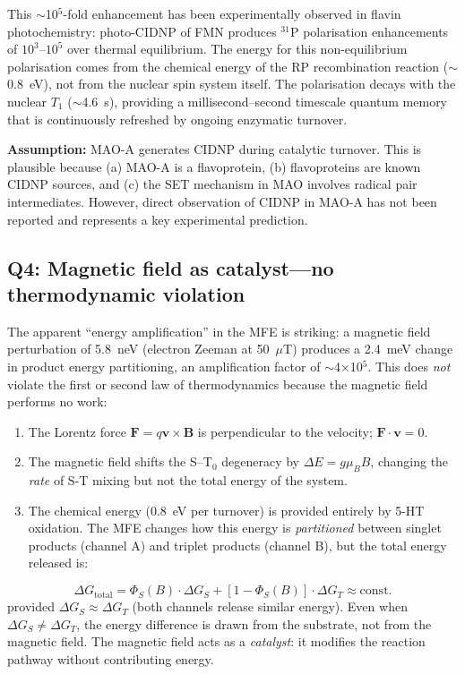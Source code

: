 This $\sim$10$^5$-fold enhancement has been experimentally observed in flavin photochemistry\cite{Tsentalovich2002}: photo-CIDNP of FMN produces $^{31}$P polarisation enhancements of $10^3$--$10^5$ over thermal equilibrium. The energy for this non-equilibrium polarisation comes from the chemical energy of the RP recombination reaction ($\sim$0.8~eV), not from the nuclear spin system itself. The polarisation decays with the nuclear $T_1$ ($\sim$4.6~s), providing a millisecond--second timescale quantum memory that is continuously refreshed by ongoing enzymatic turnover.

\textbf{Assumption:} MAO-A generates CIDNP during catalytic turnover. This is plausible because (a) MAO-A is a flavoprotein, (b) flavoproteins are known CIDNP sources\cite{Tsentalovich2002}, and (c) the SET mechanism in MAO involves radical pair intermediates\cite{Edmondson2004}. However, direct observation of CIDNP in MAO-A has not been reported and represents a key experimental prediction.

\subsection{Q4: Magnetic field as catalyst---no thermodynamic violation}

The apparent ``energy amplification'' in the MFE is striking: a magnetic field perturbation of 5.8~neV (electron Zeeman at 50~$\mu$T) produces a 2.4~meV change in product energy partitioning, an amplification factor of $\sim$4$\times$10$^5$. This does \emph{not} violate the first or second law of thermodynamics because the magnetic field performs no work:

\begin{enumerate}
\item The Lorentz force $\mathbf{F} = q\mathbf{v} \times \mathbf{B}$ is perpendicular to the velocity; $\mathbf{F} \cdot \mathbf{v} = 0$.
\item The magnetic field shifts the S--T$_0$ degeneracy by $\Delta E = g\mu_B B$, changing the \emph{rate} of S-T mixing but not the total energy of the system.
\item The chemical energy (0.8~eV per turnover) is provided entirely by 5-HT oxidation. The MFE changes how this energy is \emph{partitioned} between singlet products (channel A) and triplet products (channel B), but the total energy released is:
\end{enumerate}
\begin{equation}
\Delta G_\mathrm{total} = \Phi_S(B) \cdot \Delta G_S + [1 - \Phi_S(B)] \cdot \Delta G_T \approx \text{const.}
\label{eq:energy_conserve}
\end{equation}
provided $\Delta G_S \approx \Delta G_T$ (both channels release similar energy). Even when $\Delta G_S \neq \Delta G_T$, the energy difference is drawn from the substrate, not from the magnetic field. The magnetic field acts as a \emph{catalyst}: it modifies the reaction pathway without contributing energy.

